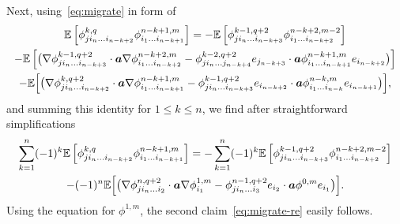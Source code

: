 \documentclass[JEP,XML,SOM,Unicode,published]{cedram}
\theoremstyle{plain}
\theoremstyle{definition}
\numberwithin{equation}{section}
\newcommand{\ee}{e}
\newcommand{\Aa}{\boldsymbol a}
\newcommand{\expec}[1]{\mathbb{E}\left[ #1 \right]}
\newcommand{\Bexpec}[1]{\mathbb{E}\Bigl[ #1 \Bigr]}
\begin{document}
Next, using~\eqref{eq:migrate} in form of
\begin{multline*}
\expec{\phi^{k,q}_{ji_n\ldots i_{n-k+2}}\phi^{n-k+1,m}_{i_1\ldots i_{n-k+1}}}=-\expec{\phi^{k-1,q+2}_{ji_n\ldots i_{n-k+3}}\phi^{n-k+2,m-2}_{i_1\ldots i_{n-k+2}}}\\
-\expec{\big(\nabla\phi^{k-1,q+2}_{ji_n\ldots i_{n-k+3}}\cdot\Aa\nabla\phi^{n-k+2,m}_{i_1\ldots i_{n-k+2}}-\phi^{k-2,q+2}_{ji_n\ldots j_{n-k+4}}\ee_{j_{n-k+3}}\cdot\Aa\phi^{n-k+1,m}_{i_1\ldots i_{n-k+1}}\ee_{i_{n-k+2}}\big)}\\
-\Bexpec{\big(\nabla\phi^{k,q+2}_{ji_n\ldots i_{n-k+2}}\cdot\Aa\nabla\phi^{n-k+1,m}_{i_1\ldots i_{n-k+1}}-\phi^{k-1,q+2}_{ji_n\ldots i_{n-k+3}}\ee_{i_{n-k+2}}\cdot\Aa\phi^{n-k,m}_{i_1\ldots i_{n-k}}\ee_{i_{n-k+1}}\big)},
\end{multline*}
and summing this identity for $1\le k\le n$, we find after straightforward simplifications
\begin{multline*}
\sum_{k=1}^n(-1)^k\expec{\phi^{k,q}_{ji_n\ldots i_{n-k+2}}\phi^{n-k+1,m}_{i_1\ldots i_{n-k+1}}}=-\sum_{k=1}^n(-1)^k\expec{\phi^{k-1,q+2}_{ji_n\ldots i_{n-k+3}}\phi^{n-k+2,m-2}_{i_1\ldots i_{n-k+2}}}\\
-(-1)^n\Bexpec{\big(\nabla\phi^{n,q+2}_{ji_n\ldots i_{2}}\cdot\Aa\nabla\phi^{1,m}_{i_1}-\phi^{n-1,q+2}_{ji_n\ldots i_{3}}\ee_{i_{2}}\cdot\Aa\phi^{0,m}\ee_{i_{1}}\big)}.
\end{multline*}
Using the equation for $\phi^{1,m}$, the second claim~\eqref{eq:migrate-re} easily follows.
\end{document}
